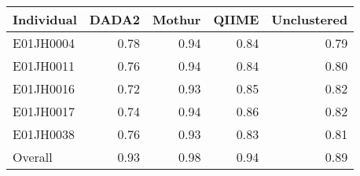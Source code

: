 
\begin{tabular}{l|r|r|r|r}
\hline
Individual & DADA2 & Mothur & QIIME & Unclustered\\
\hline
E01JH0004 & 0.78 & 0.94 & 0.84 & 0.79\\
\hline
E01JH0011 & 0.76 & 0.94 & 0.84 & 0.80\\
\hline
E01JH0016 & 0.72 & 0.93 & 0.85 & 0.82\\
\hline
E01JH0017 & 0.74 & 0.94 & 0.86 & 0.82\\
\hline
E01JH0038 & 0.76 & 0.93 & 0.83 & 0.81\\
\hline
Overall & 0.93 & 0.98 & 0.94 & 0.89\\
\hline
\end{tabular}
